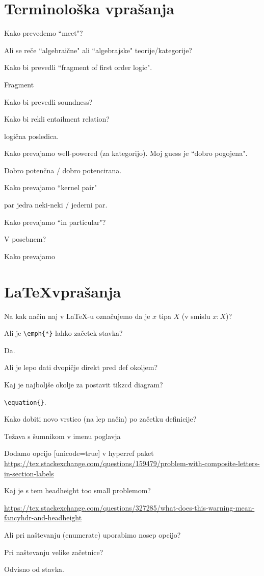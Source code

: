 \documentclass[12pt,a4paper]{article}
\newcommand\ans{\item[\textbf{A:}]}
\begin{document}
    \section*{Terminološka vprašanja}
    \begin{vprasanja}
        \item Kako prevedemo ``meet"?
        \ans
        \item Ali se reče ``algebraične" ali ``algebrajske" teorije/kategorije?
        \ans
        \item Kako bi prevedli ``fragment of first order logic".
        \ans Fragment
        \item Kako bi prevedli soundness?
        \ans
        \item Kako bi rekli entailment relation?
        \ans logična posledica.
        \item Kako prevajamo well-powered (za kategorijo). Moj guess je ``dobro pogojena".
        \ans Dobro potenčna / dobro potencirana.
        \item Kako prevajamo ``kernel pair"
        \ans par jedra neki-neki / jederni par.
        \item Kako prevajamo ``in particular"?
        \ans V posebnem?
        \item Kako prevajamo 
    \end{vprasanja}

    \section*{\LaTeX vprašanja}
    \begin{vprasanja}
        \item Na kak način naj v \LaTeX -u označujemo da je $x$ tipa $X$ (v smislu $x:X$)?
        \ans
        \item Ali je \verb|\emph{*}| lahko začetek stavka?
        \ans Da.
        \item Ali je lepo dati dvopičje direkt pred def okoljem?
        \ans
        \item Kaj je najboljše okolje za postavit tikzcd diagram?
        \ans \verb|\equation{}|.
        \item Kako dobiti novo vrstico (na lep način) po začetku definicije?
        \ans 
        \item Težava s šumnikom v imenu poglavja
        \ans Dodamo opcijo [unicode=true] v hyperref paket
        \url{https://tex.stackexchange.com/questions/159479/problem-with-composite-letters-in-section-labels}
        \item Kaj je s tem headheight too small problemom?
        \ans \url{https://tex.stackexchange.com/questions/327285/what-does-this-warning-mean-fancyhdr-and-headheight}
        \item Ali pri naštevanju (enumerate) uporabimo nosep opcijo?
        \ans
        \item Pri naštevanju velike začetnice?
        \ans Odvisno od stavka.
    \end{vprasanja}
\end{document}
